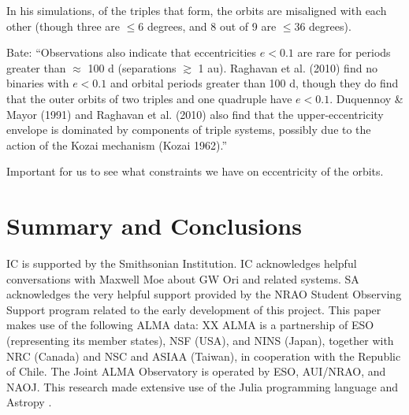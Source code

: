 \documentclass{aastex6}
\begin{document}
In his simulations, of the triples that form, the orbits are misaligned with each other (though three are $\leq 6$ degrees, and 8 out of 9 are $\leq 36$ degrees).

Bate:  ``Observations also indicate that eccentricities $e < 0.1$ are rare for periods greater than $\approx$ 100 d (separations $\gtrsim$ 1 au). Raghavan et al. (2010) find no binaries with $e < 0.1$ and orbital periods greater than 100 d, though they do find that the outer orbits of two triples and one quadruple have $e < 0.1$. Duquennoy \& Mayor (1991) and Raghavan et al. (2010) also find that the upper-eccentricity envelope is dominated by components of triple systems, possibly due to the action of the Kozai mechanism (Kozai 1962).''

Important for us to see what constraints we have on eccentricity of the orbits.

\section{Summary and Conclusions} \label{sec:summary}

\acknowledgments
IC is supported by the Smithsonian Institution. IC acknowledges helpful conversations with Maxwell Moe about GW Ori and related systems.  SA acknowledges the very helpful support provided by the NRAO Student Observing Support program related to the early development of this project.  This paper makes use of the following ALMA data: XX  ALMA is a partnership of ESO (representing its member states), NSF (USA), and NINS (Japan), together with NRC (Canada) and NSC and ASIAA (Taiwan), in cooperation with the Republic of Chile.  The Joint ALMA Observatory is operated by ESO, AUI/NRAO, and NAOJ.  This research made extensive use of the Julia programming language \citep{julia12} and Astropy \citep{astropy13}.



\end{document}
